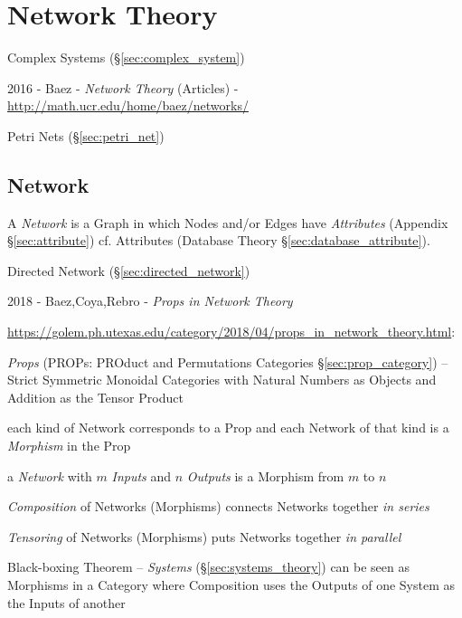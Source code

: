 \section{Network Theory}\label{sec:network_theory}

Complex Systems (\S\ref{sec:complex_system})

2016 - Baez - \emph{Network Theory} (Articles) -
\url{http://math.ucr.edu/home/baez/networks/}

Petri Nets (\S\ref{sec:petri_net})



\subsection{Network}\label{sec:network}

A \emph{Network} is a Graph in which Nodes and/or Edges have \emph{Attributes}
(Appendix \S\ref{sec:attribute}) \fist cf. Attributes (Database Theory
\S\ref{sec:database_attribute}).

\fist Directed Network (\S\ref{sec:directed_network})

\asterism

2018 - Baez,Coya,Rebro - \emph{Props in Network Theory}

\url{https://golem.ph.utexas.edu/category/2018/04/props_in_network_theory.html}:

\emph{Props} (PROPs: PROduct and Permutations Categories
\S\ref{sec:prop_category}) -- Strict Symmetric Monoidal Categories with Natural
Numbers as Objects and Addition as the Tensor Product

each kind of Network corresponds to a Prop and each Network of
that kind is a \emph{Morphism} in the Prop

a \emph{Network} with $m$ \emph{Inputs} and $n$ \emph{Outputs} is a Morphism
from $m$ to $n$

\emph{Composition} of Networks (Morphisms) connects Networks together \emph{in
  series}

\emph{Tensoring} of Networks (Morphisms) puts Networks together \emph{in
  parallel}

Black-boxing Theorem -- \emph{Systems} (\S\ref{sec:systems_theory}) can be seen
as Morphisms in a Category where Composition uses the Outputs of one System as
the Inputs of another

